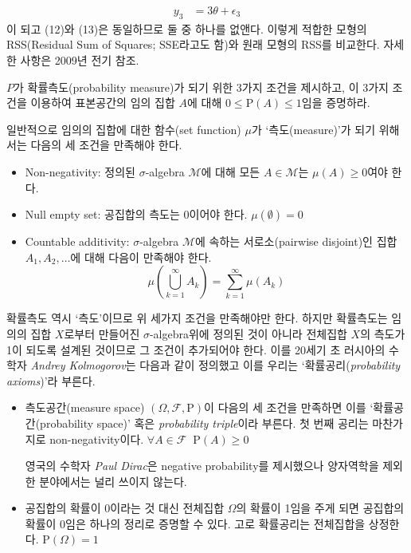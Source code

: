 \documentclass[answers]{exam}
\begin{document}
\begin{questions}
\begin{solution}
\begin{enumerate}[(a)]
\begin{align}
        y_{3} &= 3\theta+\epsilon_{3}
      \end{align}
      이 되고 (12)와 (13)은 동일하므로 둘 중 하나를 없앤다. 이렇게 적합한 모형의 RSS(Residual Sum of Squares; SSE라고도 함)와 원래 모형의 RSS를 비교한다. 자세한 사항은 2009년 전기 참조.
    \end{enumerate}
   \end{solution}
   \question
   $P$가 확률측도(probability measure)가 되기 위한 3가지 조건을 제시하고, 이 3가지 조건을 이용하여 표본공간의 임의 집합 $A$에 대해 $0\leq \mathrm{P}\left(A\right) \leq 1$임을 증명하라.
   \begin{solution}
    일반적으로 임의의 집합에 대한 함수(set function) $\mu$가 `측도(measure)'가 되기 위해서는 다음의 세 조건을 만족해야 한다.
    \begin{itemize}
      \item Non-negativity: 정의된 $\sigma$-algebra $\mathcal{M}$에 대해 모든 $A\in\mathcal{M}$는 $\mu\left(A\right)\geq 0$여야 한다.
      \item Null empty set: 공집합의 측도는 0이어야 한다. $\mu\left(\emptyset\right)=0$
      \item Countable additivity: $\sigma$-algebra $\mathcal{M}$에 속하는 서로소(pairwise disjoint)인 집합 $A_{1},A_{2},\ldots$에 대해 다음이 만족해야 한다.
      \begin{equation}
        \mu\left(\bigcup_{k=1}^{\infty}A_{k}\right) = \sum_{k=1}^{\infty}\mu\left(A_{k}\right)
      \end{equation}
    \end{itemize}
    확률측도 역시 `측도'이므로 위 세가지 조건을 만족해야만 한다. 하지만 확률측도는 임의의 집합 $X$로부터 만들어진 $\sigma$-algebra위에 정의된 것이 아니라 전체집합 $X$의 측도가 1이 되도록 설계된 것이므로 그 조건이 추가되어야 한다. 이를 20세기 초 러시아의 수학자 \emph{Andrey Kolmogorov}는 다음과 같이 정의했고 이를 우리는 `확률공리(\emph{probability axioms})'라 부른다.
      \begin{itemize}
        \item 측도공간(measure space) $\left(\Omega, \mathcal{F},\mathrm{P}\right)$이 다음의 세 조건을 만족하면 이를 `확률공간(probability space)' 혹은 \emph{probability triple}이라 부른다. 첫 번째 공리는 마찬가지로 non-negativity이다. $\forall A\in \mathcal{F}\;\; \mathrm{P}\left(A\right)\geq 0$\par
        영국의 수학자 \emph{Paul Dirac}은 negative probability를 제시했으나 양자역학을 제외한 분야에서는 널리 쓰이지 않는다.
        \item 공집합의 확률이 0이라는 것 대신 전체집합 $\Omega$의 확률이 1임을 주게 되면 공집합의 확률이 0임은 하나의 정리로 증명할 수 있다. 고로 확률공리는 전체집합을 상정한다. $\mathrm{P}\left(\Omega\right)=1$

\end{itemize}
\end{solution}
\end{questions}
\end{document}
